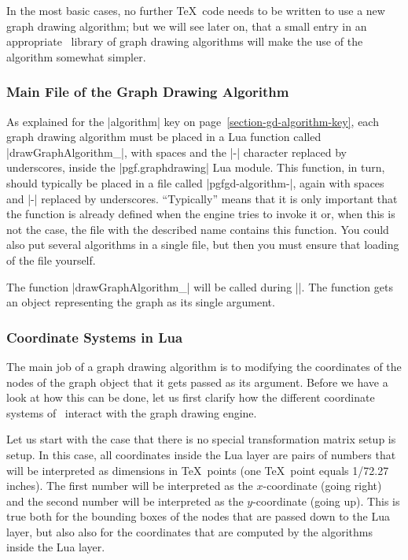 In the most basic cases, no further \TeX\ code needs to be written to
use a new graph drawing algorithm; but we will see later on, that a
small entry in an appropriate \pgfname\ library of graph drawing
algorithms will make the use of the algorithm somewhat simpler.\


\subsubsection{Main File of the Graph Drawing Algorithm}

As explained for the |algorithm| key on
page~\ref{section-gd-algorithm-key}, each graph drawing algorithm  
must be placed in a Lua function called
|drawGraphAlgorithm_|, with spaces and the |-|
character replaced by underscores, inside the |pgf.graphdrawing| Lua 
module. This function, in turn, should typically be placed in a file 
called |pgfgd-algorithm-|, again with spaces and
|-| replaced by underscores. ``Typically'' means that it is only
important that the function is already defined when the engine
tries to invoke it or, when this is not the case, the file with the
described name contains this function. You could also put several
algorithms in a single file, but then you must ensure that loading of
the file yourself.

The function |drawGraphAlgorithm_| will be called
during |\pgfgdendscope|. The function gets an object
representing the graph as its single argument. 


\subsubsection{Coordinate Systems in Lua}

\label{section-gd-lua-coordinates}

The main job of a graph drawing algorithm is to modifying the
coordinates of the nodes of the graph object that it gets passed as
its argument. Before we have a look at how this can be done, let us
first clarify how the different coordinate systems of \pgfname\
interact with the graph drawing engine.

Let us start with the case that there is no special transformation
matrix setup is setup. In this case, all coordinates inside the Lua
layer are pairs of numbers that will be interpreted as dimensions in
\TeX\ points (one \TeX\ point equals 1/72.27 inches). The first number
will be interpreted as the $x$-coordinate (going right) and the second
number will be interpreted as the $y$-coordinate (going up). This is
true both for the bounding boxes of the nodes that are passed down to
the Lua layer, but also also for the coordinates that are computed by
the algorithms inside the Lua layer.

